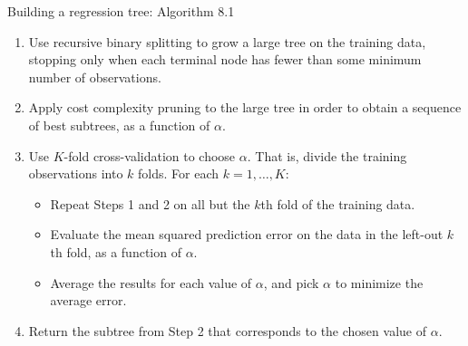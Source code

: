 \documentclass[
  10pt,
  ignorenonframetext,
]{beamer}
\providecommand{\tightlist}{%
  \setlength{\itemsep}{0pt}\setlength{\parskip}{0pt}}
\begin{document}
\begin{frame}
\begin{block}{Building a regression tree: Algorithm 8.1}
\protect\hypertarget{building-a-regression-tree-algorithm-8.1}{}
\(~\)

\begin{enumerate}
\tightlist
\item
  Use recursive binary splitting to grow a large tree on the training
  data, stopping only when each terminal node has fewer than some
  minimum number of observations.
\end{enumerate}

\vspace{2mm}

\begin{enumerate}
\setcounter{enumi}{1}
\tightlist
\item
  Apply cost complexity pruning to the large tree in order to obtain a
  sequence of best subtrees, as a function of \(\alpha\).
\end{enumerate}

\vspace{2mm}

\begin{enumerate}
\setcounter{enumi}{2}
\tightlist
\item
  Use \(K\)-fold cross-validation to choose \(\alpha\). That is, divide
  the training observations into \(k\) folds. For each
  \(k = 1,\ldots, K\):

  \begin{itemize}
  \tightlist
  \item
    Repeat Steps 1 and 2 on all but the \(k\)th fold of the training
    data.
  \item
    Evaluate the mean squared prediction error on the data in the
    left-out \(k\)th fold, as a function of \(\alpha\).
  \item
    Average the results for each value of \(\alpha\), and pick
    \(\alpha\) to minimize the average error.
  \end{itemize}
\end{enumerate}

\vspace{2mm}

\begin{enumerate}
\setcounter{enumi}{3}
\tightlist
\item
  Return the subtree from Step 2 that corresponds to the chosen value of
  \(\alpha\).
\end{enumerate}
\end{block}
\end{frame}
\end{document}
